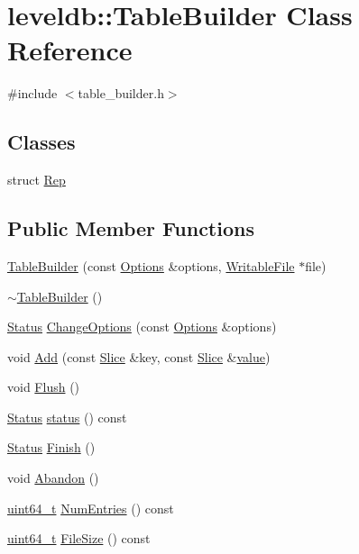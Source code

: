 \hypertarget{classleveldb_1_1_table_builder}{}\section{leveldb\+:\+:Table\+Builder Class Reference}
\label{classleveldb_1_1_table_builder}


{\ttfamily \#include $<$table\+\_\+builder.\+h$>$}

\subsection*{Classes}
\begin{DoxyCompactItemize}
\item 
struct \hyperlink{structleveldb_1_1_table_builder_1_1_rep}{Rep}
\end{DoxyCompactItemize}
\subsection*{Public Member Functions}
\begin{DoxyCompactItemize}
\item 
\hyperlink{classleveldb_1_1_table_builder_a7f5d99e06039848d9b342a4871b31cc6}{Table\+Builder} (const \hyperlink{structleveldb_1_1_options}{Options} \&options, \hyperlink{classleveldb_1_1_writable_file}{Writable\+File} $\ast$file)
\item 
\hyperlink{classleveldb_1_1_table_builder_aa166d9bae1402bf2e77f7c45469e715d}{$\sim$\+Table\+Builder} ()
\item 
\hyperlink{classleveldb_1_1_status}{Status} \hyperlink{classleveldb_1_1_table_builder_a6e37a5ddc82161e8665f2fba08031c24}{Change\+Options} (const \hyperlink{structleveldb_1_1_options}{Options} \&options)
\item 
void \hyperlink{classleveldb_1_1_table_builder_a37bd347cb6340215475ac9b42dc19d10}{Add} (const \hyperlink{classleveldb_1_1_slice}{Slice} \&key, const \hyperlink{classleveldb_1_1_slice}{Slice} \&\hyperlink{cache_8cc_a0f61d63b009d0880a89c843bd50d8d76}{value})
\item 
void \hyperlink{classleveldb_1_1_table_builder_a544560b4c97cd382ba9b8e0ef69dacfa}{Flush} ()
\item 
\hyperlink{classleveldb_1_1_status}{Status} \hyperlink{classleveldb_1_1_table_builder_aaec88faf09425e9c229a69e34656bf80}{status} () const 
\item 
\hyperlink{classleveldb_1_1_status}{Status} \hyperlink{classleveldb_1_1_table_builder_a88f4bae006782e24462362d489dd3f35}{Finish} ()
\item 
void \hyperlink{classleveldb_1_1_table_builder_a3b4dded079f960b8624bdfa13d967b94}{Abandon} ()
\item 
\hyperlink{stdint_8h_aaa5d1cd013383c889537491c3cfd9aad}{uint64\+\_\+t} \hyperlink{classleveldb_1_1_table_builder_a765e1dfcb4e12d0b56fd70e758d9a5c2}{Num\+Entries} () const 
\item 
\hyperlink{stdint_8h_aaa5d1cd013383c889537491c3cfd9aad}{uint64\+\_\+t} \hyperlink{classleveldb_1_1_table_builder_a5844a15a8f94d2c44da709937f29039c}{File\+Size} () const 
\end{DoxyCompactItemize}


